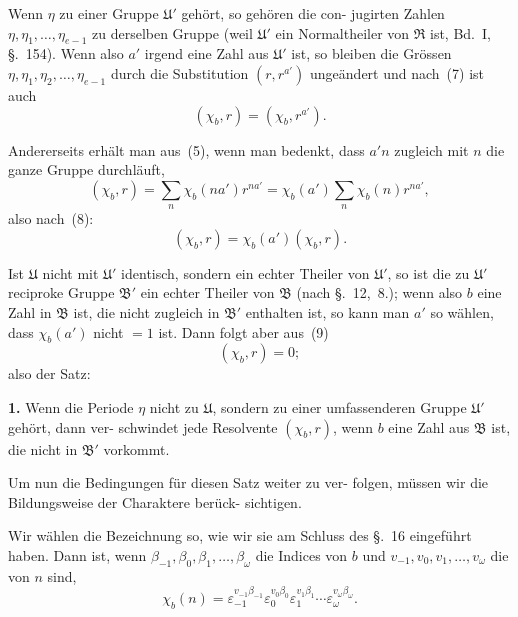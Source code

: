 \documentclass[12pt,a4paper]{article}
\theoremstyle{plain}
\theoremstyle{definition}
\theoremstyle{remark}
\begin{document}
Wenn $\eta$ zu einer Gruppe $\mathfrak{U}'$ gehört, so gehören die con-
jugirten Zahlen $\eta, \eta_1, \ldots, \eta_{e-1}$ zu derselben Gruppe (weil $\mathfrak{U}'$ ein
Normaltheiler von $\mathfrak{R}$ ist, Bd.~I, \S.~154). Wenn also $a'$ irgend
eine Zahl aus $\mathfrak{U}'$ ist, so bleiben die Grössen $\eta, \eta_1, \eta_2, \ldots, \eta_{e-1}$
durch die Substitution $(r, r^{a'})$ ungeändert und nach~(7) ist auch
\begin{equation}\tag{8}
(\chi_b, r) = (\chi_b, r^{a'}).
\end{equation}

Andererseits erhält man aus~(5), wenn man bedenkt, dass
$a'n$ zugleich mit $n$ die ganze Gruppe durchläuft,
\[
(\chi_b, r) = \sum_n \chi_b(na') r^{na'} = \chi_b(a') \sum_n \chi_b(n) r^{na'},
\]
also nach~(8):
\begin{equation}\tag{9}
(\chi_b, r) = \chi_b(a') (\chi_b, r).
\end{equation}

Ist $\mathfrak{U}$ nicht mit $\mathfrak{U}'$ identisch, sondern ein echter Theiler
von $\mathfrak{U}'$, so ist die zu $\mathfrak{U}'$ reciproke Gruppe $\mathfrak{B}'$ ein echter Theiler
von $\mathfrak{B}$ (nach \S.~12,~8.); wenn also $b$ eine Zahl in $\mathfrak{B}$ ist, die nicht
zugleich in $\mathfrak{B}'$ enthalten ist, so kann man $a'$ so wählen, dass
$\chi_b(a')$ nicht $= 1$ ist. Dann folgt aber aus~(9)
\begin{equation}\tag{10}
(\chi_b, r) = 0;
\end{equation}
also der Satz:

\textbf{1.} Wenn die Periode $\eta$ nicht zu $\mathfrak{U}$, sondern zu einer
umfassenderen Gruppe $\mathfrak{U}'$ gehört, dann ver-
schwindet jede Resolvente $(\chi_b, r)$, wenn $b$ eine
Zahl aus $\mathfrak{B}$ ist, die nicht in $\mathfrak{B}'$ vorkommt.

Um nun die Bedingungen für diesen Satz weiter zu ver-
folgen, müssen wir die Bildungsweise der Charaktere berück-
sichtigen.

Wir wählen die Bezeichnung so, wie wir sie am Schluss des
\S.~16 eingeführt haben. Dann ist, wenn $\beta_{-1}, \beta_0, \beta_1, \ldots, \beta_\omega$ die
Indices von $b$ und $v_{-1}, v_0, v_1, \ldots, v_\omega$ die von $n$ sind,
\begin{equation}\tag{11}
\chi_b(n) = \varepsilon_{-1}^{v_{-1}\beta_{-1}} \varepsilon_0^{v_0\beta_0} \varepsilon_1^{v_1\beta_1} \cdots \varepsilon_\omega^{v_\omega\beta_\omega}.
\end{equation}
\end{document}
